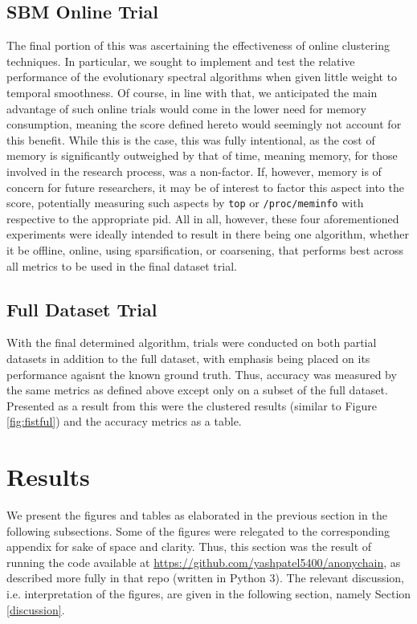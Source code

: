 \documentclass{article}
\begin{document}
\subsection{SBM Online Trial}
The final portion of this was ascertaining the effectiveness of online clustering techniques. In particular, we sought to implement and test the relative performance of the evolutionary spectral algorithms when given little weight to temporal smoothness. Of course, in line with that, we anticipated the main advantage of such online trials would come in the lower need for memory consumption, meaning the score defined hereto would seemingly not account for this benefit. While this is the case, this was fully intentional, as the cost of memory is significantly outweighed by that of time, meaning memory, for those involved in the research process, was a non-factor. If, however, memory is of concern for future researchers, it may be of interest to factor this aspect into the score, potentially measuring such aspects by \texttt{top} or \texttt{/proc/meminfo} with respective to the appropriate pid. All in all, however, these four aforementioned experiments were ideally intended to result in there being one algorithm, whether it be offline, online, using sparsification, or coarsening, that performs best across all metrics to be used in the final dataset trial. 

\subsection{Full Dataset Trial}
With the final determined algorithm, trials were conducted on both partial datasets in addition to the full dataset, with emphasis being placed on its performance agaisnt the known ground truth. Thus, accuracy was measured by the same metrics as defined above except only on a subset of the full dataset. Presented as a result from this were the clustered results (similar to Figure \ref{fig:fistful}) and the accuracy metrics as a table.

\clearpage
\section{Results}\label{results}
We present the figures and tables as elaborated in the previous section in the following subsections. Some of the figures were relegated to the corresponding appendix for sake of space and clarity. Thus, this section was the result of running the code available at \url{https://github.com/yashpatel5400/anonychain}, as described more fully in that repo (written in Python 3). The relevant discussion, i.e. interpretation of the figures, are given in the following section, namely Section \ref{discussion}.
\end{document}
